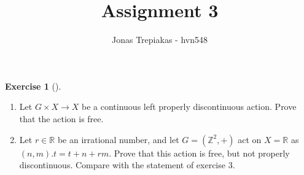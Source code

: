 \documentclass[reqno]{amsart}
\title{Assignment 3}
\author{Jonas Trepiakas - hvn548}
\theoremstyle{definition}
\newtheorem{exercise}[theorem]{Exercise}
\theoremstyle{remark}
\begin{document}
\maketitle

    \begin{exercise}[]
        \begin{enumerate}
            \item Let $G \times X \to X$ be a continuous left
                properly discontinuous action. Prove
                that the action is free.
            \item Let $r \in \mathbb{R}$ be an irrational number,
                and let $G = \left( \mathbb{Z}^2, + \right) $ 
                act on $X = \mathbb{R}$ as 
                $\left( n,m \right) . t = t+ n + rm$. Prove
                that this action is free, but not
                properly discontinuous. Compare with the
                statement of exercise 3.
        \end{enumerate}
    \end{exercise}
\end{document}
